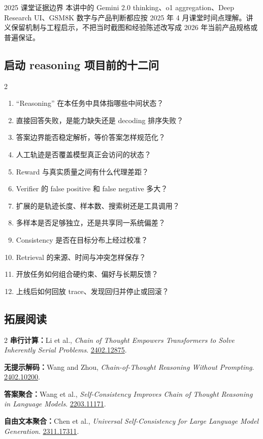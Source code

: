 \begin{warningbox}{2025 课堂证据边界}
本讲中的 Gemini 2.0 thinking、o1 aggregation、Deep Research UI、GSM8K 数字与产品判断都应按 2025 年 4 月课堂时间点理解。讲义保留机制与工程启示，不把当时截图和经验陈述改写成 2026 年当前产品规格或普遍保证。
\end{warningbox}

\subsection{启动 reasoning 项目前的十二问}

\small
\begin{multicols}{2}
\begin{enumerate}
  \item “Reasoning” 在本任务中具体指哪些中间状态？
  \item 直接回答失败，是能力缺失还是 decoding 排序失败？
  \item 答案边界能否稳定解析，等价答案怎样规范化？
  \item 人工轨迹是否覆盖模型真正会访问的状态？
  \item Reward 与真实质量之间有什么代理差距？
  \item Verifier 的 false positive 和 false negative 多大？
  \item 扩展的是轨迹长度、样本数、搜索树还是工具调用？
  \item 多样本是否足够独立，还是共享同一系统偏差？
  \item Consistency 是否在目标分布上经过校准？
  \item Retrieval 的来源、时间与冲突怎样保存？
  \item 开放任务如何组合硬约束、偏好与长期反馈？
  \item 上线后如何回放 trace、发现回归并停止或回滚？
\end{enumerate}
\end{multicols}
\normalsize

\subsection{拓展阅读}

\scriptsize
\begin{multicols}{2}
\noindent\textbf{串行计算：}Li et al., \emph{Chain of Thought Empowers Transformers to Solve Inherently Serial Problems}. \href{https://arxiv.org/abs/2402.12875}{2402.12875}.\par
\noindent\textbf{无提示解码：}Wang and Zhou, \emph{Chain-of-Thought Reasoning Without Prompting}. \href{https://arxiv.org/abs/2402.10200}{2402.10200}.\par
\noindent\textbf{答案聚合：}Wang et al., \emph{Self-Consistency Improves Chain of Thought Reasoning in Language Models}. \href{https://arxiv.org/abs/2203.11171}{2203.11171}.\par
\noindent\textbf{自由文本聚合：}Chen et al., \emph{Universal Self-Consistency for Large Language Model Generation}. \href{https://arxiv.org/abs/2311.17311}{2311.17311}.\par
\end{multicols}
\normalsize



